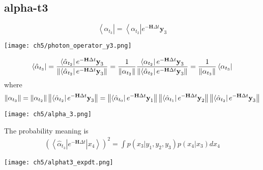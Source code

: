 \subsection{alpha-t3}
\begin{definition}
\begin{equation}
        \left< \alpha_{t_3} \right| = \left< \alpha_{t_2} \right| e^{-\textbf{H}\Delta t} \textbf{y}_3               
\end{equation}
\begin{center}
        \texttt{[image: ch5/photon\_operator\_y3.png]}   
\end{center}
\begin{equation}
        \left< \hat{\alpha}_{t_3} \right| 
	= \frac{\left< \hat{\alpha}_{t_2} \right| e^{-\textbf{H}\Delta t} \textbf{y}_3}{\left\lVert\left< \hat{\alpha}_{t_2} \right| e^{-\textbf{H}\Delta t} \textbf{y}_3\right\rVert} 
	= \frac{1}{\left\lVert\alpha_{t_{2}}\right\rVert} \frac{\left< \alpha_{t_2} \right| e^{-\textbf{H}\Delta t} \textbf{y}_3}{\left\lVert\left< \hat{\alpha}_{t_2} \right| e^{-\textbf{H}\Delta t} \textbf{y}_3\right\rVert} 
	= \frac{1}{\left\lVert\alpha_{t_3}\right\rVert} \left< \alpha_{t_3} \right|
\end{equation}
where
\begin{equation}
        \left\lVert\alpha_{t_3}\right\rVert = \left\lVert\alpha_{t_{2}}\right\rVert \left\lVert\left< \hat{\alpha}_{t_2} \right| e^{-\textbf{H}\Delta t} \textbf{y}_3\right\rVert 
        = \left\lVert\left < \hat{\alpha}_{t_{0}} \right| e^{-\textbf{H}\Delta t} \textbf{y}_1\right\rVert \left\lVert\left< \hat{\alpha}_{t_1} \right| e^{-\textbf{H}\Delta t} \textbf{y}_2\right\rVert \left\lVert\left < \hat{\alpha}_{t_{2}} \right| e^{-\textbf{H}\Delta t} \textbf{y}_3\right\rVert    
\end{equation}
\begin{center}
\texttt{[image: ch5/alpha\_3.png]}
\end{center}
\end{definition}

\begin{definition}
The probability meaning is 
\begin{align*}
        (\left< \hat{\alpha}_{t_3}| e^{-\textbf{H}\Delta t} | x_4 \right>)^2 = \int p(x_3 | y_1, y_2, y_3) p(x_4|x_3) dx_4  
\end{align*}
\begin{center}
        \texttt{[image: ch5/alphat3\_expdt.png]}   
\end{center}
\end{definition}

